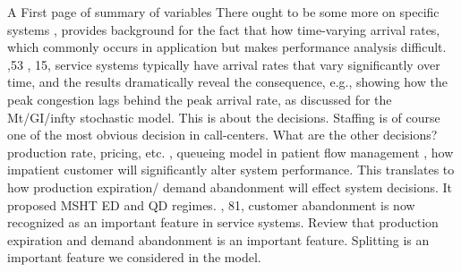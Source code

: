 \markdownRendererUlBeginTight
\markdownRendererUlItem A First page of summary of variables\markdownRendererUlItemEnd 
\markdownRendererUlEndTight \markdownRendererInterblockSeparator
{}\markdownRendererHorizontalRule{}\markdownRendererInterblockSeparator
{}\markdownRendererInterblockSeparator
{}\markdownRendererInterblockSeparator
{}There ought to be some more on specific systems\markdownRendererInterblockSeparator
{}\markdownRendererUlBeginTight
{}, provides background for the fact that how time-varying arrival rates, which commonly occurs in application but makes performance analysis difficult.\markdownRendererUlItemEnd 
{}\markdownRendererUlItemEnd 
{},53\markdownRendererUlItemEnd 
{}, 15, service systems typically have arrival rates that vary significantly over time, and the results dramatically reveal the consequence, e.g., showing how the peak congestion lags behind the peak arrival rate, as discussed for the \markdownRendererDollarSign{}M\markdownRendererUnderscore{}t/GI/\markdownRendererBackslash{}infty\markdownRendererDollarSign{} stochastic model.\markdownRendererUlItemEnd 
\markdownRendererUlEndTight \markdownRendererInterblockSeparator
{}\markdownRendererInterblockSeparator
{}This is about the decisions. Staffing is of course one of the most obvious decision in call-centers. What are the other decisions? production rate, pricing, etc.\markdownRendererInterblockSeparator
{}\markdownRendererInterblockSeparator
{}\markdownRendererHorizontalRule{}\markdownRendererInterblockSeparator
{}\markdownRendererInterblockSeparator
{}\markdownRendererUlBeginTight
{}, queueing model in patient flow management\markdownRendererUlItemEnd 
{}, how impatient customer will significantly alter system performance. This translates to how production expiration/ demand abandonment will effect system decisions. It proposed MSHT ED and QD regimes.\markdownRendererUlItemEnd 
{}, 81, customer abandonment is now recognized as an important feature in service systems. Review that production expiration and demand abandonment is an important feature. Splitting is an important feature we considered in the model.\markdownRendererUlItemEnd 
